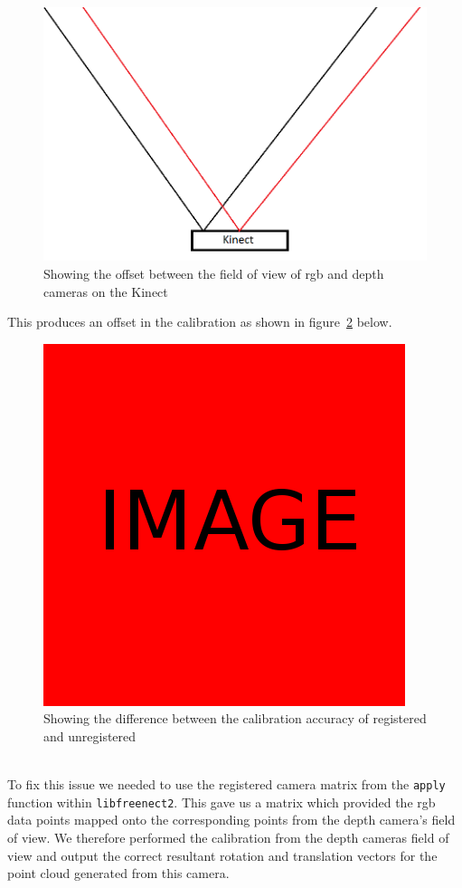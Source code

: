 \documentclass{article}
\begin{document}
\begin{figure}[h]
  \centering
  \includegraphics[scale=0.7]{rgbdepth}
  \caption{Showing the offset between the field of view of rgb and depth cameras on the Kinect}
  \label{fig:rgbdepth}
\end{figure}
This produces an offset in the calibration as shown in figure~\ref{fig:calibrationoffset} below.
\\
\begin{figure}[h]
  \centering
  \includegraphics[scale=0.3]{placeholder}
  \caption{Showing the difference between the calibration accuracy of registered and unregistered}
  \label{fig:calibrationoffset}
\end{figure}
\\
To fix this issue we needed to use the registered camera matrix from the \texttt{apply} function within \texttt{libfreenect2}. This gave us a matrix which provided the rgb data points mapped onto the corresponding points from the depth camera's field of view. We therefore performed the calibration from the depth cameras field of view and output the correct resultant rotation and translation vectors for the point cloud generated from this camera.
\newpage
\end{document}
